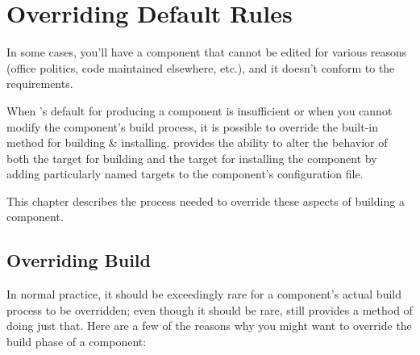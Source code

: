 %
%
%
%
\chapter{Overriding Default Rules} \label{chap:overriding}

In some cases, you'll have a component \makefile that cannot be edited
for various reasons (office politics, code maintained elsewhere,
etc.), and it doesn't conform to the \lmsbw requirements.

When \lmsbw's default for producing a component is insufficient or
when you cannot modify the component's build process, it is possible
to override the built-in method for building \& installing.  \lmsbw
provides the ability to alter the behavior of both the \makefile
target for building and the target for installing the component by
adding particularly named targets to the component's configuration
file.

This chapter describes the process needed to override these aspects of
building a component.

\section{Overriding Build}\label{overriding:overriding-build}

In normal practice, it should be exceedingly rare for a component's
actual build process to be overridden; even though it should be rare,
\lmsbw still provides a method of doing just that.  Here are a few of
the reasons why you might want to override the build phase of a
component:

